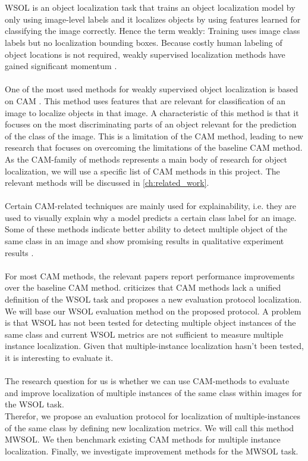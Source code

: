 \\\\
\gls{WSOL} is an object localization task that trains an object localization model by only using image-level labels and it localizes objects by using features learned for classifying the image correctly. Hence the term weakly: Training uses image class labels but no localization bounding boxes. Because costly human labeling of object locations is not required, weakly supervised localization methods have gained significant momentum \cite{zhou2016cvpr, selvaraju2017grad, chattopadhay2018grad, wang2021minmaxcam, wang2020score, choe2020evaluating}.
\\\\
One of the most used methods for weakly supervised object localization is based on \gls{CAM} \cite{zhou2016cvpr}. This method uses features that are relevant for classification of an image to localize objects in that image. A characteristic of this method is that it focuses on the most discriminating parts of an object relevant for the prediction of the class of the image. This is a limitation of the \gls{CAM} method, leading to new research \cite{selvaraju2017grad, chattopadhay2018grad, wang2021minmaxcam, wang2020score, choe2020evaluating} that focuses on overcoming the limitations of the baseline \gls{CAM} method. As the CAM-family of methods represents a main body of research for object localization, we will use a specific list of CAM methods in this project. The relevant methods will be discussed in \ref{ch:related_work}. 
\\\\
Certain CAM-related techniques are mainly used for explainability, i.e. they are used to visually explain why a model predicts a certain class label for an image. Some of these methods indicate better ability to detect multiple object of the same class in an image and show promising results in qualitative experiment results \cite{wang2020score}.
\\\\
For most CAM methods, the relevant papers report performance improvements over the baseline \gls{CAM} method. \cite{choe2020evaluating} criticizes that \gls{CAM} methods lack a unified definition of the \gls{WSOL} task and proposes a new evaluation protocol localization. We will base our \gls{WSOL} evaluation method on the proposed protocol. A problem is that \gls{WSOL} has not been tested for detecting multiple object instances of the same class and current \gls{WSOL} metrics are not sufficient to measure multiple instance localization. Given that multiple-instance localization hasn't been tested, it is interesting to evaluate it. 
\\\\
The research question for us is whether we can use CAM-methods to evaluate and improve localization of multiple instances of the same class within images for the \gls{WSOL} task.
\\
Therefor, we propose an evaluation protocol for localization of multiple-instances of the same class by defining new localization metrics. We will call this method \gls{MWSOL}. We then benchmark existing CAM methods for multiple instance localization. Finally, we investigate improvement methods for the \gls{MWSOL} task.\\
